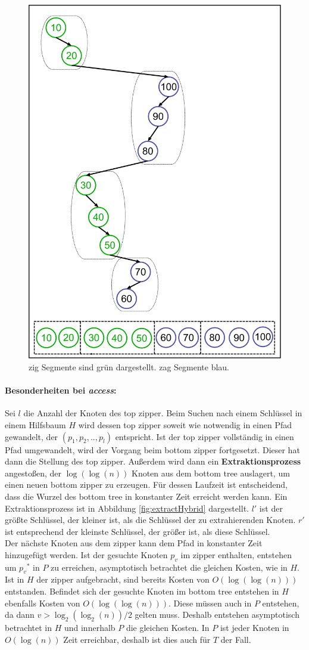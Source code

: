 \documentclass[a4paper,12pt]{article}
\begin{document}
\begin{figure}[H]
	\centering
	\includegraphics[height= 0.7\textwidth]{Medien/Zipper/preferredPathZigZag}
	\caption{zig Segmente sind grün dargestellt. zag Segmente blau. }
	\label{fig:preferredPathZigZag}
\end{figure}

\paragraph{Besonderheiten bei \textit{access}:}
Sei $l$ die Anzahl der Knoten des top zipper.
Beim Suchen nach einem Schlüssel in einem Hilfsbaum $H$ wird dessen top zipper soweit wie notwendig in einen Pfad gewandelt, der $\left(p_1, p_2, .., p_l\right)$ entspricht. Ist der top zipper vollständig in einen Pfad umgewandelt, wird der Vorgang beim bottom zipper fortgesetzt. Dieser hat dann die Stellung des top zipper. Außerdem wird dann ein \textbf{Extraktionsprozess} angestoßen, der $\log\left(\log\left(n\right)\right)$ Knoten aus dem bottom tree auslagert, um einen neuen bottom zipper zu erzeugen. Für dessen Laufzeit ist entscheidend, dass die Wurzel des bottom tree in konstanter Zeit erreicht werden kann. Ein Extraktionsprozess ist in Abbildung \ref{fig:extractHybrid} dargestellt. $l'$ ist der größte Schlüssel, der kleiner ist, als die Schlüssel der zu extrahierenden Knoten. $r'$ ist entsprechend der kleinste Schlüssel, der größer ist, als diese Schlüssel.  \\
Der nächste Knoten aus dem zipper kann dem Pfad in konstanter Zeit hinzugefügt werden. Ist der gesuchte Knoten $p_v$  im zipper enthalten, entstehen um ${p_v}^*$ in  $P$ zu erreichen, asymptotisch betrachtet die gleichen Kosten, wie in $H$. Ist in $H$ der zipper aufgebracht, sind bereits Kosten von $O\left(\log\left(\log\left(n\right)\right)\right)$ entstanden. Befindet sich der gesuchte Knoten im  bottom tree entstehen in $H$ ebenfalls Kosten von  $O\left(\log\left(\log\left(n\right)\right)\right)$. Diese müssen auch in $P$ entstehen, da dann $v > \log_2\left(\log_2\left(n\right)\right) /2$  gelten muss. Deshalb entstehen asymptotisch betrachtet in $H$ und innerhalb $P$ die gleichen Kosten. In $P$ ist jeder Knoten in $O\left(\log\left(n\right)\right)$ Zeit erreichbar, deshalb ist dies auch für  $T$ der Fall. 
\end{document}
